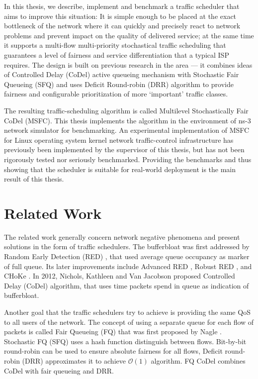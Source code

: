 In this thesis, we describe, implement and benchmark a traffic scheduler that aims to improve this situation: It is simple enough to be placed at the exact bottleneck of the network where it can quickly and precisely react to network problems and prevent impact on the quality of delivered service; at the same time it supports a multi-flow multi-priority stochastical traffic scheduling that guarantees a level of fairness and service differentiation that a typical ISP requires. The design is built on previous research in the area --- it combines ideas of Controlled Delay (CoDel) \cite{CoDel} active queueing mechanism with Stochastic Fair Queueing (SFQ) \cite{SFQ} and uses Deficit Round-robin (DRR) \cite{EffDRR} algorithm to provide fairness and configurable prioritization of more `important' traffic classes.

The resulting traffic-scheduling algorithm is called Multilevel Stochastically Fair CoDel (MSFC). This thesis implements the algorithm in the environment of ns-3 network simulator \cite{ns3} for benchmarking. An experimental implementation of MSFC for Linux operating system kernel network traffic-control infrastructure has previously been implemented by the supervisor of this thesis, but has not been rigorously tested nor seriously benchmarked. Providing the benchmarks and thus showing that the scheduler is suitable for real-world deployment is the main result of this thesis.


\section*{Related Work}
The related work generally concern network negative phenomena and present solutions in the form of traffic schedulers. The bufferbloat was first addressed by Random Early Detection (RED) \cite{Floyd:1993:RED:169931.169935}, that used average queue occupancy as marker of full queue. Its later improvements include Advanced RED \cite{Floyd01adaptivered:}, Robust RED \cite{RRED}, and CHoKe \cite{pan2000choke}. In 2012, Nichols, Kathleen and Van Jacobson proposed Controlled Delay (CoDel) algorithm, that uses time packets spend in queue as indication of bufferbloat.

Another goal that the traffic schedulers try to achieve is providing the same QoS to all users of the network. The concept of using a separate queue for each flow of packets is called Fair Queueing (FQ) that was first proposed by Nagle \cite{Nagle:FQ}. Stochastic FQ (SFQ) \cite{SFQ} uses a hash function distinguish between flows. Bit-by-bit round-robin \cite{demers1989analysis} can be used to ensure absolute fairness for all flows, Deficit round-robin (DRR) \cite{EffDRR} approximates it to achieve $\mathcal{O}(1)$ algorithm. FQ CoDel \cite{fq_codel} combines CoDel with fair queueing and DRR.

